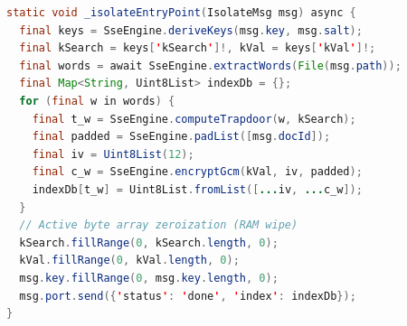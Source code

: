 \documentclass[preview,varwidth=90mm]{standalone}
\begin{document}
\begin{lstlisting}[language=Java]
static void _isolateEntryPoint(IsolateMsg msg) async {
  final keys = SseEngine.deriveKeys(msg.key, msg.salt);
  final kSearch = keys['kSearch']!, kVal = keys['kVal']!;
  final words = await SseEngine.extractWords(File(msg.path));
  final Map<String, Uint8List> indexDb = {};
  for (final w in words) {
    final t_w = SseEngine.computeTrapdoor(w, kSearch);
    final padded = SseEngine.padList([msg.docId]);
    final iv = Uint8List(12);
    final c_w = SseEngine.encryptGcm(kVal, iv, padded);
    indexDb[t_w] = Uint8List.fromList([...iv, ...c_w]);
  }
  // Active byte array zeroization (RAM wipe)
  kSearch.fillRange(0, kSearch.length, 0);
  kVal.fillRange(0, kVal.length, 0);
  msg.key.fillRange(0, msg.key.length, 0);
  msg.port.send({'status': 'done', 'index': indexDb});
}
\end{lstlisting}
\end{document}
